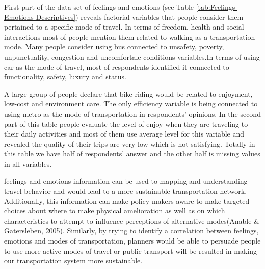 \documentclass[
11pt, %
oneside, %
english, %
singlespacing, %
]{macthesis} %
\begin{document}
First part of the data set of feelings and emotions (see Table \ref{tab:Feelings-Emotions-Descriptives}) reveals factorial variables that people consider them pertained to a specific mode of travel. In terms of freedom, health and social interactions most of people mention them related to walking as a transportation mode. Many people consider using bus connected to unsafety, poverty, unpunctuality, congestion and uncomfortale conditions variables.In terms of using car as the mode of travel, most of respondents identified it connected to functionality, safety, luxury and status.

A large group of people declare that bike riding would be related to enjoyment, low-cost and environment care. The only efficiency variable is being connected to using metro as the mode of transportation in respondents' opinions. In the second part of this table people evaluate the level of enjoy when they are traveling to their daily activities and most of them use average level for this variable and revealed the quality of their trips are very low which is not satisfying. Totally in this table we have half of respondents' answer and the other half is missing values in all variables.

feelings and emotions information can be used to mapping and understanding travel behavior and would lead to a more sustainable transportation network. Additionally, this information can make policy makers aware to make targeted choices about where to make physical amelioration as well as on which characteristics to attempt to influence perceptions of alternative modes(Anable \& Gatersleben, 2005). Similarly, by trying to identify a correlation between feelings, emotions and modes of transportation, planners would be able to persuade people to use more active modes of travel or public transport will be resulted in making our transportation system more sustainable.
\end{document}
